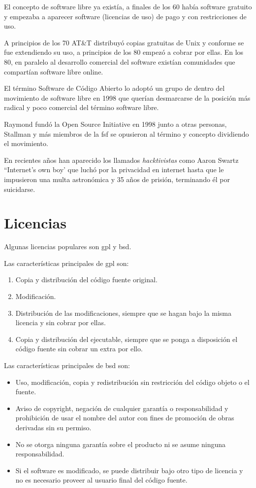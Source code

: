 El concepto de software libre ya existía, a finales de los 60 había software gratuito y empezaba a aparecer software (licencias de uso) de pago y con restricciones de uso.

A principios de los 70 AT\&T distribuyó copias gratuitas de Unix y conforme se fue extendiendo su uso, a principios de los 80 empezó a cobrar por ellas. En los 80, en paralelo al desarrollo comercial del software existían comunidades que compartían software libre online.

El término Software de Código Abierto lo adoptó un grupo de dentro del movimiento de software libre en 1998 que querían desmarcarse de la posición más radical y poco comercial del término software libre.

Raymond fundó la Open Source Initiative en 1998 junto a otras personas, Stallman y más miembros de la \gls{fsf} se opusieron al término y concepto dividiendo el movimiento.

En recientes años han aparecido los llamados \textit{hacktivistas} como Aaron Swartz ``Internet's own boy' que luchó por la privacidad en internet hasta que le impusieron una multa astronómica y 35 años de prisión, terminando él por suicidarse.
\section{Licencias}

Algunas licencias populares son \gls{gpl} y \gls{bsd}.

Las características principales de \gls{gpl} son:
\begin{enumerate}
    \item Copia y distribución del código fuente original.
    \item Modificación.
    \item Distribución de las modificaciones, siempre que se hagan bajo la misma licencia y sin cobrar por ellas.
    \item Copia y distribución del ejecutable, siempre que se ponga a disposición el código fuente sin cobrar un extra por ello.
\end{enumerate}

Las características principales de \gls{bsd} son:
\begin{itemize}
    \item Uso, modificación, copia y redistribución sin restricción del código objeto o el fuente.
    \item Aviso de copyright, negación de cualquier garantía o responsabilidad y prohibición de usar el nombre del autor con fines de promoción de obras derivadas sin su permiso.
    \item No se otorga ninguna garantía sobre el producto ni se asume ninguna responsabilidad.
    \item Si el software es modificado, se puede distribuir bajo otro tipo de licencia y no es necesario proveer al usuario final del código fuente.
\end{itemize}


